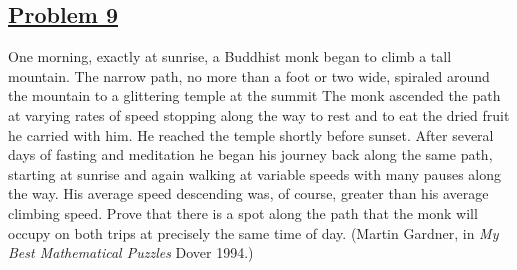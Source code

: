 \documentclass[10pt,letterpaper]{article}
\begin{document}
	\subsection*{{\color{purple}\underline{Problem 9}}}
	One morning, exactly at sunrise, a Buddhist monk began to climb a tall mountain. The narrow
path, no more than a foot or two wide, spiraled around the mountain to a glittering temple at the summit
The monk ascended the path at varying rates of speed stopping along the way to rest and to eat the
dried fruit he carried with him. He reached the temple shortly before sunset. After several days of fasting
and meditation he began his journey back along the same path, starting at sunrise and again walking at
variable speeds with many pauses along the way. His average speed descending was, of course, greater than
his average climbing speed.
Prove that there is a spot along the path that the monk will occupy on both trips at precisely the same
time of day. (Martin Gardner, in \emph{My Best Mathematical Puzzles} Dover 1994.)
	
\end{document}
